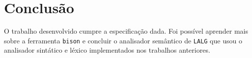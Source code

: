 \section{Conclusão \label{sec:conclusao}}

O trabalho desenvolvido cumpre a especificação dada. Foi possível aprender mais sobre a ferramenta \texttt{bison} e concluir o analisador semântico de \texttt{LALG} que usou o analisador sintático e léxico implementados nos trabalhos anteriores.
